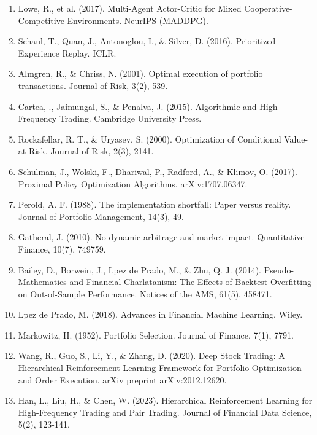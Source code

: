 \documentclass[11pt]{article}
\begin{document}
\begin{enumerate}
\item Lowe, R., et al. (2017). Multi-Agent Actor-Critic for Mixed Cooperative-Competitive Environments. NeurIPS (MADDPG).

\item Schaul, T., Quan, J., Antonoglou, I., \& Silver, D. (2016). Prioritized Experience Replay. ICLR.

\item Almgren, R., \& Chriss, N. (2001). Optimal execution of portfolio transactions. Journal of Risk, 3(2), 539.

\item Cartea, ., Jaimungal, S., \& Penalva, J. (2015). Algorithmic and High-Frequency Trading. Cambridge University Press.

\item Rockafellar, R. T., \& Uryasev, S. (2000). Optimization of Conditional Value-at-Risk. Journal of Risk, 2(3), 2141.

\item Schulman, J., Wolski, F., Dhariwal, P., Radford, A., \& Klimov, O. (2017). Proximal Policy Optimization Algorithms. arXiv:1707.06347.

\item Perold, A. F. (1988). The implementation shortfall: Paper versus reality. Journal of Portfolio Management, 14(3), 49.

\item Gatheral, J. (2010). No-dynamic-arbitrage and market impact. Quantitative Finance, 10(7), 749759.

\item Bailey, D., Borwein, J., Lpez de Prado, M., \& Zhu, Q. J. (2014). Pseudo-Mathematics and Financial Charlatanism: The Effects of Backtest Overfitting on Out-of-Sample Performance. Notices of the AMS, 61(5), 458471.

\item Lpez de Prado, M. (2018). Advances in Financial Machine Learning. Wiley.

\item Markowitz, H. (1952). Portfolio Selection. Journal of Finance, 7(1), 7791.

\item Wang, R., Guo, S., Li, Y., \& Zhang, D. (2020). Deep Stock Trading: A Hierarchical Reinforcement Learning Framework for Portfolio Optimization and Order Execution. arXiv preprint arXiv:2012.12620.

\item Han, L., Liu, H., \& Chen, W. (2023). Hierarchical Reinforcement Learning for High-Frequency Trading and Pair Trading. Journal of Financial Data Science, 5(2), 123-141.


\end{enumerate}
\end{document}
